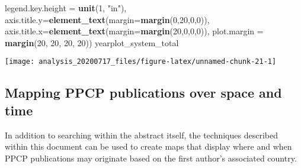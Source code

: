 \documentclass[
]{article}
\newenvironment{Shaded}{\begin{snugshade}}{\end{snugshade}}
\newcommand{\DataTypeTok}[1]{\textcolor[rgb]{0.13,0.29,0.53}{#1}}
\newcommand{\DecValTok}[1]{\textcolor[rgb]{0.00,0.00,0.81}{#1}}
\newcommand{\KeywordTok}[1]{\textcolor[rgb]{0.13,0.29,0.53}{\textbf{#1}}}
\newcommand{\NormalTok}[1]{#1}
\newcommand{\StringTok}[1]{\textcolor[rgb]{0.31,0.60,0.02}{#1}}
\begin{document}
\begin{Shaded}
\begin{Highlighting}[]
        \DataTypeTok{legend.key.height =} \KeywordTok{unit}\NormalTok{(}\DecValTok{1}\NormalTok{, }\StringTok{"in"}\NormalTok{),}
        \DataTypeTok{axis.title.y=}\KeywordTok{element_text}\NormalTok{(}\DataTypeTok{margin=}\KeywordTok{margin}\NormalTok{(}\DecValTok{0}\NormalTok{,}\DecValTok{20}\NormalTok{,}\DecValTok{0}\NormalTok{,}\DecValTok{0}\NormalTok{)), }
        \DataTypeTok{axis.title.x=}\KeywordTok{element_text}\NormalTok{(}\DataTypeTok{margin=}\KeywordTok{margin}\NormalTok{(}\DecValTok{20}\NormalTok{,}\DecValTok{0}\NormalTok{,}\DecValTok{0}\NormalTok{,}\DecValTok{0}\NormalTok{)),}
        \DataTypeTok{plot.margin =} \KeywordTok{margin}\NormalTok{(}\DecValTok{20}\NormalTok{, }\DecValTok{20}\NormalTok{, }\DecValTok{20}\NormalTok{, }\DecValTok{20}\NormalTok{))}
\NormalTok{yearplot_system_total}
\end{Highlighting}
\end{Shaded}

\begin{center}\texttt{[image: analysis\_20200717\_files/figure-latex/unnamed-chunk-21-1]} \end{center}

\hypertarget{mapping-ppcp-publications-over-space-and-time}{%
\subsection{Mapping PPCP publications over space and
time}\label{mapping-ppcp-publications-over-space-and-time}}

In addition to searching within the abstract itself, the techniques
described within this document can be used to create maps that display
where and when PPCP publications may originate based on the first
author's associated country.
\end{document}
